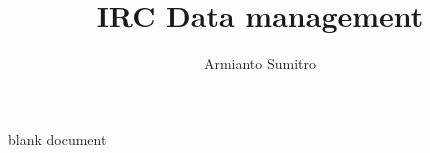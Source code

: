 \documentclass{article}
\title{IRC Data management}
\author{Armianto Sumitro}
\date{}
\begin{document}
blank document
\end{document}
